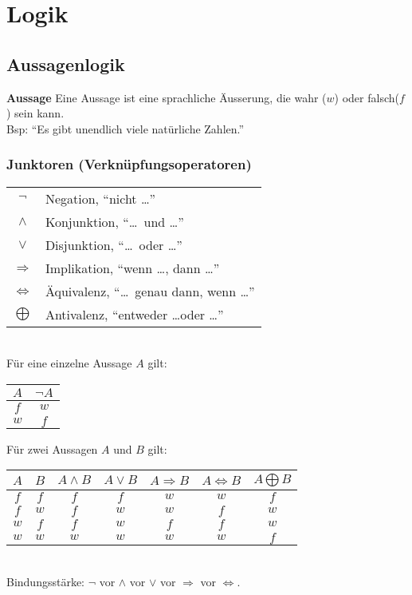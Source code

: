 \section{Logik}
\subsection{Aussagenlogik}
\textbf{Aussage} Eine Aussage ist eine sprachliche Äusserung, 
die wahr ($w$) oder falsch($f$) sein kann.\\
Bsp: \enquote{Es gibt unendlich viele natürliche Zahlen.}

\subsubsection{Junktoren (Verknüpfungsoperatoren)}
\begin{tabular}{cl}
	$\neg$				& Negation, \enquote{nicht \dots}\\
	$\wedge$ 			& Konjunktion, \enquote{\dots\ und \dots}\\
	$\vee$ 				& Disjunktion, \enquote{\dots\ oder \dots}\\
	$\Rightarrow$ 		& Implikation, \enquote{wenn \dots, dann \dots}\\
	$\Leftrightarrow$	& Äquivalenz, \enquote{\dots\ genau dann, wenn \dots} \\
	$\bigoplus$			& Antivalenz, \enquote{entweder \dots oder  \dots}\\
\end{tabular}\\

Für eine einzelne Aussage $A$ gilt:\\
\begin{tabular}{c||c}
	$A$ & $\neg A$ \\\hline
	$f$ & $w$ \\
	$w$ & $f$ \\
\end{tabular}

Für zwei Aussagen $A$ und $B$ gilt:\\
\begin{tabular}{c|c||c|c|c|c|c}
	$A$ & $B$ 	& $A \wedge B$ 	& $A \vee B$ 	& $A \Rightarrow B$ 	& $A \Leftrightarrow B$ 	& $A \bigoplus B$ \\\hline
	$f$ & $f$ 	& $f$				& $f$			& $w$				& $w$					 	& $f$\\
	$f$ & $w$ 	& $f$				& $w$			& $w$				& $f$					 	& $w$\\	
	$w$ & $f$ 	& $f$				& $w$			& $f$				& $f$						& $w$\\
	$w$ & $w$ 	& $w$				& $w$			& $w$				& $w$						& $f$\\
\end{tabular}\\
Bindungsstärke: $\neg$ vor $\wedge$ vor $\vee$ vor $\Rightarrow$ vor $\Leftrightarrow$.\\

